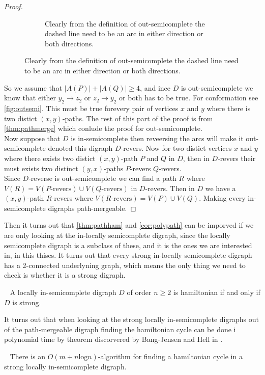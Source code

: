 \begin{proof}
\begin{figure}
\begin{subfigure}{0.60\textwidth}
            \caption{Clearly from the definition of out-semicomplete the dashed line need to be an arc in either direction or both directions.}
            \label{fig:outsemi}
        \end{subfigure}
    \end{figure}
    So we assume that $|A(P)|+|A(Q)|\geq 4$, and ince $D$ is out-semicomplete we know that either $y_2\rightarrow z_2$ or $z_2\rightarrow y_2$ or both has to be true. For conformation see \autoref{fig:outsemi}.
    This must be true forevery pair of vertices $x$ and $y$ where there is two distict $(x,y)$-paths. The rest of this part of the proof is from \autoref{thm:pathmerge} which conlude the proof for out-semicomplete.\\

    Now suppose that $D$ is in-semicomplete then reveersing the arcs will make it out-semicomplete denoted this digraph $D$-revers. 
    Now for two distict vertices $x$ and $y$ where there exists two distict $(x,y)$-path $P$ and $Q$ in $D$, then in $D$-revers their must exists two distinct $(y,x)$-paths $P$-revers $Q$-revers. \\
    Since $D$-reverse is out-semicomplete we can find a path $R$ where $V(R)=V(P\text{-revers}) \cup V(Q\text{-revers})$ in $D$-revers. 
    Then in $D$ we have a $(x,y)$-path $R$-revers where $V(R\text{-revers})=V(P)\cup V(Q)$. 
    Making every in-semicomplete digraphs path-mergeable.   
\end{proof}


Then it turns out that \autoref{thm:pathham} and \autoref{cor:polypath} can be imporved if we are only looking at the in-locally semicomplete digraph, since the locally semicomplete digraph is a subclass of these, and it is the ones we are interested in, in this thises. 
It turns out that every strong in-locally semicomplete digraph has a 2-connected underlyning graph, which means the only thing we need to check is whether it is a strong digraph.
\begin{thm}~\cite{bangJCT59}
    A locally in-semicomplete digraph $D$ of order $n\geq 2$ is hamiltonian if and only if $D$ is strong.
\end{thm}

It turns out that when looking at the strong locally in-semicomplete digraphs out of the path-mergeable digraph finding the hamiltonian cycle can be done i polynomial time by theorem discorvered by Bang-Jensen and Hell in \cite{bangDM41}.
\begin{thm}~\cite{bangDM41}
    There is an $O(m+n\text{log}n)$-algorithm for finding a hamiltonian cycle in a strong locally in-semicomplete digraph.
\end{thm}

